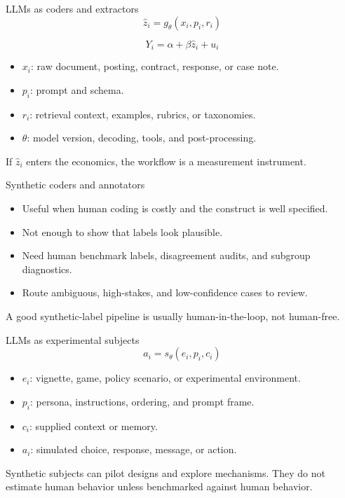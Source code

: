 \documentclass[aspectratio=169,11pt]{beamer}
\newcommand{\1}{\mathbf{1}}
\begin{document}
\begin{frame}{LLMs as coders and extractors}
\small
\[
\widehat z_i = g_{\theta}(x_i,p_i,r_i)
\]

\[
Y_i=\alpha+\beta \widehat z_i+u_i
\]

\begin{itemize}
    \item \(x_i\): raw document, posting, contract, response, or case note.
    \item \(p_i\): prompt and schema.
    \item \(r_i\): retrieval context, examples, rubrics, or taxonomies.
    \item \(\theta\): model version, decoding, tools, and post-processing.
\end{itemize}

\medskip
If \(\widehat z_i\) enters the economics, the workflow is a measurement instrument.
\end{frame}

\begin{frame}{Synthetic coders and annotators}
\begin{itemize}
    \item Useful when human coding is costly and the construct is well specified.
    \item Not enough to show that labels look plausible.
    \item Need human benchmark labels, disagreement audits, and subgroup diagnostics.
    \item Route ambiguous, high-stakes, and low-confidence cases to review.
\end{itemize}

\medskip
A good synthetic-label pipeline is usually human-in-the-loop, not human-free.
\end{frame}

\begin{frame}{LLMs as experimental subjects}
\small
\[
a_i=s_{\theta}(e_i,p_i,c_i)
\]

\begin{itemize}
    \item \(e_i\): vignette, game, policy scenario, or experimental environment.
    \item \(p_i\): persona, instructions, ordering, and prompt frame.
    \item \(c_i\): supplied context or memory.
    \item \(a_i\): simulated choice, response, message, or action.
\end{itemize}

\medskip
Synthetic subjects can pilot designs and explore mechanisms. They do not estimate human behavior unless benchmarked against human behavior.
\end{frame}
\end{document}
